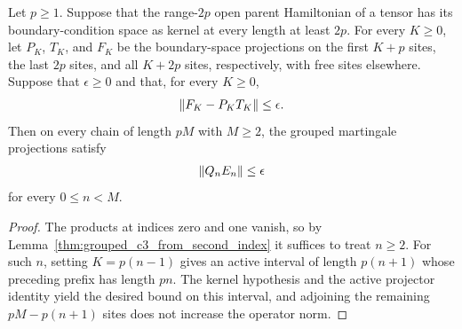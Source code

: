 \begin{lemma}
    \label{thm:grouped_c3_from_projector_defect}
    \leanok
    Let $p\geq1$. Suppose that the range-$2p$ open parent
    Hamiltonian of a tensor has its boundary-condition space as kernel
    at every length at least $2p$. For every $K\geq0$, let
    $P_K$, $T_K$, and $F_K$ be the boundary-space projections
    on the first $K+p$ sites, the last $2p$ sites, and all
    $K+2p$ sites, respectively, with free sites elsewhere.
    Suppose that $\epsilon\geq0$ and that, for every $K\geq0$,
    \begin{align}
        \|F_K-P_KT_K\|\leq\epsilon.
        \notag
    \end{align}
    Then on every chain of length $pM$ with $M\geq2$, the grouped
    martingale projections satisfy
    \begin{align}
        \|Q_nE_n\|\leq\epsilon
        \notag
    \end{align}
    for every $0\leq n<M$.
\end{lemma}
\begin{proof}
    \leanok
    The products at indices zero and one vanish, so by
    Lemma~\ref{thm:grouped_c3_from_second_index} it suffices to treat
    $n\geq2$. For such $n$, setting $K=p(n-1)$ gives an active interval of
    length $p(n+1)$ whose preceding prefix has length $pn$. The kernel
    hypothesis and the active projector identity yield the desired bound on
    this interval, and adjoining the remaining $pM-p(n+1)$ sites does not
    increase the operator norm.
\end{proof}

